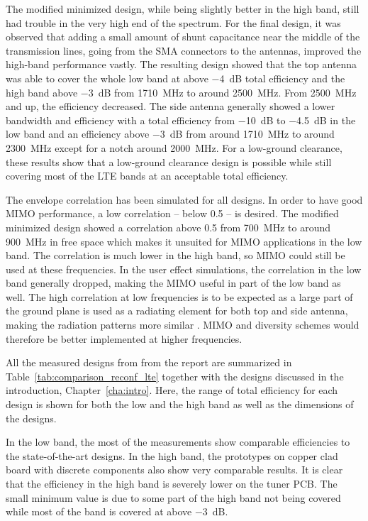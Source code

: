 The modified minimized design, while being slightly better in the high band, still had trouble in the very high end of the spectrum. For the final design, it was observed that adding a small amount of shunt capacitance near the middle of the transmission lines, going from the SMA connectors to the antennas, improved the high-band performance vastly. The resulting design showed that the top antenna was able to cover the whole low band at above \SI{-4}{dB} total efficiency and the high band above \SI{-3}{dB} from \SI{1710}{MHz} to around \SI{2500}{MHz}. From \SI{2500}{MHz} and up, the efficiency decreased. The side antenna generally showed a lower bandwidth and efficiency with a total efficiency from \SI{-10}{dB} to \SI{-4.5}{dB} in the low band and an efficiency above \SI{-3}{dB} from around \SI{1710}{MHz} to around \SI{2300}{MHz} except for a notch around \SI{2000}{MHz}. For a low-ground clearance, these results show that a low-ground clearance design is possible while still covering most of the LTE bands at an acceptable total efficiency.

The envelope correlation has been simulated for all designs. In order to have good MIMO performance, a low correlation -- below 0.5 -- is desired. The modified minimized design showed a correlation above 0.5 from \SI{700}{MHz} to around \SI{900}{MHz} in free space which makes it unsuited for MIMO applications in the low band. The correlation is much lower in the high band, so MIMO could still be used at these frequencies. In the user effect simulations, the correlation in the low band generally dropped, making the MIMO useful in part of the low band as well. The high correlation at low frequencies is to be expected as a large part of the ground plane is used as a radiating element for both top and side antenna, making the radiation patterns more similar . MIMO and diversity schemes would therefore be better implemented at higher frequencies.



All the measured designs from from the report are summarized in Table~\ref{tab:comparison_reconf_lte} together with the designs discussed in the introduction, Chapter~\ref{cha:intro}. Here, the range of total efficiency for each design is shown for both the low and the high band as well as the dimensions of the designs. 

In the low band, the most of the measurements show comparable efficiencies to the state-of-the-art designs. In the high band, the prototypes on copper clad board with discrete components also show very comparable results. It is clear that the efficiency in the high band is severely lower on the tuner PCB. The small minimum value is due to some part of the high band not being covered while most of the band is covered at above \SI{-3}{dB}.


